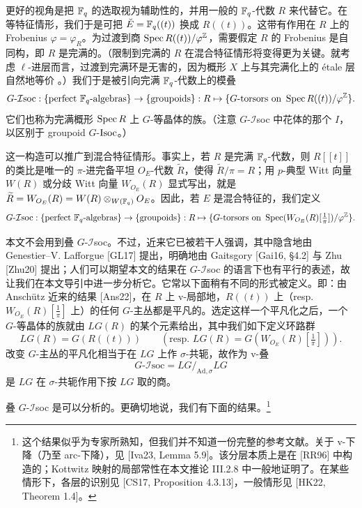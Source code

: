更好的视角是把 $\mathbb{F}_q$ 的选取视为辅助性的，并用一般的 $\mathbb{F}_q$-代数 $R$ 来代替它。在等特征情形，我们于是可把 $\breve{E}=\mathbb{F}_q((t))$ 换成 $R((t))$。这带有作用在 $R$ 上的 Frobenius $\varphi=\varphi_R$。为过渡到商 $\operatorname{Spec} R((t))/\varphi^{\mathbb{Z}}$，需要假定 $R$ 的 Frobenius 是自同构，即 $R$ 是完满的。（限制到完满的 $R$ 在混合特征情形将变得更为关键。就考虑 $\ell$-进层而言，过渡到完满环是无害的，因为概形 $X$ 上与其完满化上的 étale 层自然地等价
。）我们于是被引向完满 $\mathbb{F}_q$-代数上的模叠
\[
  G\text{-}\mathcal{I}\mathrm{soc} : \{\text{perfect } \mathbb{F}_q\text{-algebras}\} \to \{\text{groupoids}\} : R \mapsto \{G\text{-torsors on } \operatorname{Spec} R((t))/\varphi^{\mathbb{Z}}\}.
\]
它们也称为完满概形 $\operatorname{Spec} R$ 上 $G$-等晶体的族。（注意 $G$-$\mathcal{I}$soc 中花体的那个 $I$，以区别于 groupoid $G$-$\mathrm{Isoc}$。）

这一构造可以推广到混合特征情形。事实上，若 $R$ 是完满 $\mathbb{F}_q$-代数，则 $R[[t]]$ 的类比是唯一的 $\pi$-进完备平坦 $O_E$-代数 $\widetilde{R}$，使得 $\widetilde{R}/\pi=R$；用 $p$-典型 Witt 向量 $W(R)$ 或分歧 Witt 向量 $W_{O_E}(R)$ 显式写出，就是 $\widetilde{R}=W_{O_E}(R)=W(R)\otimes_{W(\mathbb{F}_q)}O_E$。因此，若 $E$ 是混合特征的，我们定义
\[
  G\text{-}\mathcal{I}\mathrm{soc} : \{\text{perfect } \mathbb{F}_q\text{-algebras}\} \to \{\text{groupoids}\} : R \mapsto \{G\text{-torsors on } \operatorname{Spec}(W_{O_E}(R)[\tfrac{1}{\pi}])/\varphi^{\mathbb{Z}}\}.
\]

本文不会用到叠 $G$-$\mathcal{I}$soc。不过，近来它已被若干人强调，其中隐含地由 Genestier–V. Lafforgue [GL17] 提出，明确地由 Gaitsgory [Gai16, §4.2] 与 Zhu [Zhu20] 提出；人们可以期望本文的结果在 $G$-$\mathcal{I}$soc 的语言下也有平行的表述，故让我们在本文导引中进一步分析它。它常以下面稍有不同的形式被定义。即：由 Anschütz 近来的结果 [Ans22]，在 $R$ 上 v-局部地，$R((t))$ 上（resp.\ $W_{O_E}(R)[\tfrac1\pi]$ 上）的任何 $G$-主丛都是平凡的。选定这样一个平凡化之后，一个 $G$-等晶体的族就由 $LG(R)$ 的某个元素给出，其中我们如下定义环路群
\[
  LG(R)=G(R((t)))\qquad(\text{resp. } LG(R)=G(W_{O_E}(R)[\tfrac{1}{\pi}])).
\]
改变 $G$-主丛的平凡化相当于在 $LG$ 上作 $\sigma$-共轭，故作为 v-叠
\[
  G\text{-}\mathcal{I}\mathrm{soc} = LG/_{\mathrm{Ad},\sigma}LG
\]
是 $LG$ 在 $\sigma$-共轭作用下按 $LG$ 取的商。

\leavevmode{}叠 $G$-$\mathcal{I}$soc 是可以分析的。更确切地说，我们有下面的结果。\footnote{这个结果似乎为专家所熟知，但我们并不知道一份完整的参考文献。关于 v-下降（乃至 arc-下降），见 [Iva23, Lemma 5.9]。该分层本质上是在 [RR96] 中构造的；Kottwitz 映射的局部常性在本文推论 III.2.8 中一般地证明了。在某些情形下，各层的识别见 [CS17, Proposition 4.3.13]，一般情形见 [HK22, Theorem 1.4]。}

